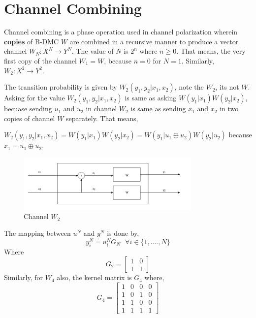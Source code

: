 \documentclass{report}
\begin{document}
\section*{Channel Combining}
Channel combining is a phase operation used in channel polarization wherein \textbf{copies} of B-DMC $W$ are combined in a recursive manner to produce a vector channel $W_{N}: X^{N} \rightarrow Y^{N}$. The value of $N$ is $2^{n}$ where $n \geq 0$. That means, the very first copy of the channel $W_{1}=W$, because $n=0$ for $N=1$. Similarly, $W_{2}: X^{2} \rightarrow Y^{2}$.
\par The transition probability is given by $W_{2}(y_{1}, y_{2}|x_{1}, x_{2})$, note the $W_{2}$, its not $W$. Asking for the value $W_{2}(y_{1}, y_{2}|x_{1}, x_{2})$ is same as asking $W(y_{1}|x_{1})W(y_{2}|x_{2})$, becuase sending $u_{1}$ and $u_{2}$ in channel $W_{2}$ is same as sending $x_{1}$ and $x_{2}$ in two copies of channel $W$ separately. That means,
\begin{center}
$W_{2}(y_{1}, y_{2}|x_{1}, x_{2}) = W(y_{1}|x_{1})W(y_{2}|x_{2}) = W(y_{1}|u_{1}\oplus u_{2})W(y_{2}|u_{2})$ because $x_{1} = u_{1} \oplus u_{2}$.
\end{center}
\begin{figure}[H]
\centering
\includegraphics[width=0.8\textwidth, height=0.2\textheight]{twochannel.png}
\caption{Channel $W_{2}$}
\end{figure}
The mapping between $u^{N}$ and $y^{N}$ is done by,
\begin{equation}
y_{i}^{N} = u_{i}^{N}G_{N} \textrm{ }\forall i \in \{1, ...., N\}
\end{equation}
Where
\[G_{2} = 
\begin{bmatrix}
1 & 0 \\
1 & 1
\end{bmatrix}
\]
Similarly, for $W_{4}$ also, the kernel matrix is $G_{4}$ where, 
\[G_{4} = 
\begin{bmatrix}
1 & 0 & 0 & 0 \\
1 & 0 & 1 & 0 \\
1 & 1 & 0 & 0 \\
1 & 1 & 1 & 1
\end{bmatrix}
\]
\end{document}
